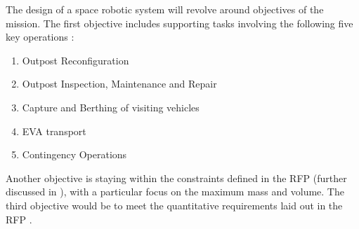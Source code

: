 The design of a space robotic system will revolve around objectives of the mission. The first objective includes supporting tasks involving the following five key operations \cite{RFP} :
\begin{enumerate}
\item{Outpost Reconfiguration}
\item{Outpost Inspection, Maintenance and Repair}
\item{Capture and Berthing of visiting vehicles}
\item{EVA transport}
\item{Contingency Operations}
\end{enumerate}

Another objective is staying within the constraints defined in the \gls{RFP} (further discussed in ), with a particular focus on the maximum mass and volume. The third objective would be to meet the quantitative requirements laid out in the \gls{RFP} \cite{RFP}.